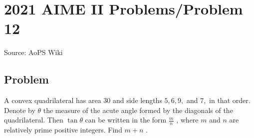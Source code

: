 \documentclass[12pt]{article}
\begin{document}
\section*{{2021 AIME II Problems/Problem 12}}
Source: AoPS Wiki

\subsection*{Problem}
A convex quadrilateral has area $30$ and side lengths $5, 6, 9,$ and $7,$ in that order. Denote by $\theta$ the measure of the acute angle formed by the diagonals of the quadrilateral. Then $\tan \theta$ can be written in the form $\tfrac{m}{n}$ , where $m$ and $n$ are relatively prime positive integers. Find $m + n$ .
\end{document}
